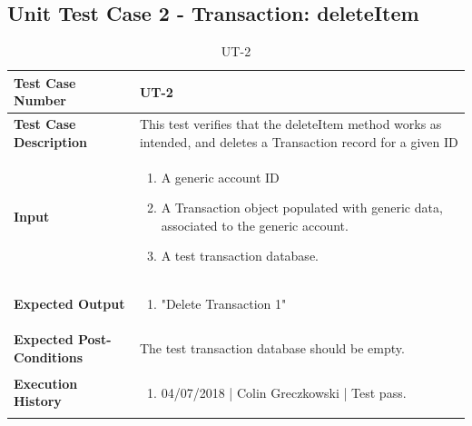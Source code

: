 \documentclass[12pt]{article}
\begin{document}
\subsection{Unit Test Case 2 - Transaction: deleteItem}
\def\arraystretch{1.5}%
\begin{table}[htbp]
\centering
\caption {UT-2}
\label{UT-2}
\begin{tabularx}{\textwidth}{ | l | X |}
\hline
\textbf{Test Case Number}      &  UT-2                         \\ \hline
\textbf{Test Case Description}    &  This test verifies that the deleteItem method works as intended, and deletes a Transaction record for a given ID                \\ \hline
\textbf{Input}         & 	\begin{enumerate}
          \item A generic account ID
	\item A Transaction object populated with generic data, associated to the generic account.
	\item A test transaction database.
\end{enumerate} \\ \hline

\textbf{Expected Output}     & \begin{enumerate}
	\item "Delete Transaction 1"
\end{enumerate} \\ \hline
\textbf{Expected Post-Conditions}           & The test transaction database should be empty.                \\ \hline
\textbf{Execution History}   &  \begin{enumerate}
	\item 04/07/2018 | Colin Greczkowski | Test pass.
\end {enumerate} \\ \hline
\end{tabularx}
\end{table}
\clearpage

\end{document}
